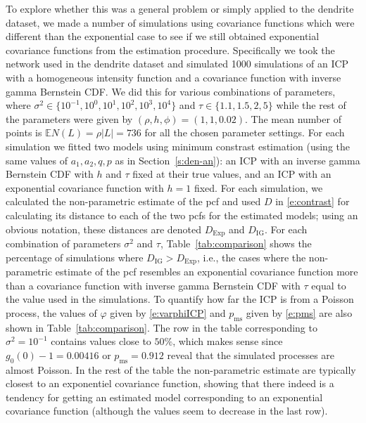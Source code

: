 \documentclass[alpha-refs]{wiley-article}
\begin{document}
To explore whether this was a general problem or simply applied to the dendrite dataset, we made a number of simulations using covariance functions which were different than the exponential case to see if we still obtained exponential covariance functions from the estimation procedure. Specifically we took the network used in the dendrite dataset and simulated 1000 simulations of an ICP with a homogeneous intensity function and a covariance function with inverse gamma Bernstein CDF. We did this for various combinations of parameters, where $\sigma^2\in\{10^{-1},10^0,10^1,10^2,10^3,10^4\}$ and $\tau\in\{1.1,1.5,2,5\}$ while the rest of the parameters were given by $(\rho, h, \phi) = (1, 1, 0.02)$. The mean number of points  is $\mathbb E N(L) = \rho|L| = 736$ for all the chosen parameter settings. For each simulation we fitted two models using minimum constrast estimation (using the same values of $a_1,a_2,q,p$ as in Section~\ref{s:den-an}): an ICP with an inverse gamma Bernstein CDF with $h$ and $\tau$ fixed at their true values, and an ICP with an exponential covariance function with $h=1$ fixed. 
For each simulation, we calculated the non-parametric estimate of the pcf and used $D$ in \eqref{e:contrast} for calculating its distance to each of the two pcfs for the estimated models; using an obvious notation, these distances are denoted $D_\text{Exp}$ and $D_\text{IG}$. For each combination of parameters $\sigma^2$ and $\tau$, Table~\ref{tab:comparison} shows the percentage of simulations where $D_\text{IG}>D_\text{Exp}$, i.e., the cases where the non-parametric estimate of the pcf resembles an exponential covariance function more than a covariance function with inverse gamma Bernstein CDF with $\tau$ equal to the value used in the simulations. To quantify how far the ICP is from a Poisson process, the values of $\varphi$ given by \eqref{e:varphiICP} and $p_\textrm{ms}$ given by \eqref{e:pms} are also shown in Table~\ref{tab:comparison}. The row in the table corresponding to $\sigma^2=10^{-1}$ contains values close to $50\%$, which makes sense since $g_0(0)-1=0.00416$ or $p_\mathrm{ms}=0.912$ reveal that the simulated processes are almost Poisson.
In the rest of the table the non-parametric estimate are typically closest to an exponentiel covariance function, showing that there indeed is a tendency for getting an estimated model corresponding to an exponential covariance function (although the values seem to decrease in the last row). 
\end{document}
